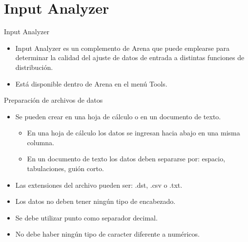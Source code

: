 \section{Input Analyzer}

\begin{frame}{Input Analyzer}
    \begin{itemize}
        \item Input Analyzer es un complemento de Arena que puede emplearse para determinar la calidad del ajuste de datos de entrada a distintas funciones de distribución.
        \item Está disponible dentro de Arena en el menú Tools.
    \end{itemize}
\end{frame}

\begin{frame}{Preparación de archivos de datos}
    \begin{itemize}
        \item Se pueden crear en una hoja de cálculo o en un documento de texto.
        \begin{itemize}
            \item En una hoja de cálculo los datos se ingresan hacia abajo en una misma columna.
            \item En un documento de texto los datos deben separarse por: espacio, tabulaciones, guión corto.
        \end{itemize}
        \item Las extensiones del archivo pueden ser: .dst, .csv o .txt.
        \item Los datos no deben tener ningún tipo de encabezado.
        \item Se debe utilizar punto como separador decimal.
        \item No debe haber ningún tipo de caracter diferente a numéricos.
    \end{itemize}
\end{frame}